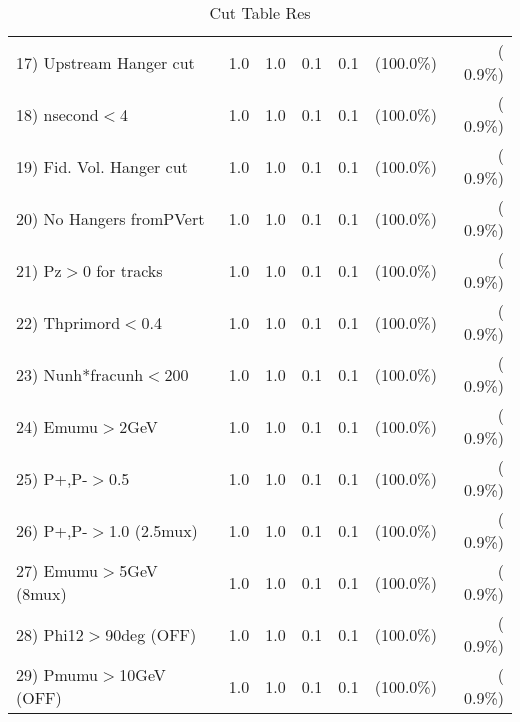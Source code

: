 \begin{table}[h!]
\begin{tabular}{||l||r|r|r|r|r|r||}
 17) Upstream Hanger cut  &          1.0 &          1.0 &          0.1 &          0.1 & (100.0\%) & (  0.9\%) \\
 18) nsecond$<$4          &          1.0 &          1.0 &          0.1 &          0.1 & (100.0\%) & (  0.9\%) \\
 19) Fid. Vol. Hanger cut &          1.0 &          1.0 &          0.1 &          0.1 & (100.0\%) & (  0.9\%) \\
 20) No Hangers fromPVert &          1.0 &          1.0 &          0.1 &          0.1 & (100.0\%) & (  0.9\%) \\
 21) Pz$>$0 for tracks    &          1.0 &          1.0 &          0.1 &          0.1 & (100.0\%) & (  0.9\%) \\
 22) Thprimord$<$0.4      &          1.0 &          1.0 &          0.1 &          0.1 & (100.0\%) & (  0.9\%) \\
 23) Nunh*fracunh$<$200   &          1.0 &          1.0 &          0.1 &          0.1 & (100.0\%) & (  0.9\%) \\
 24) Emumu$>$2GeV         &          1.0 &          1.0 &          0.1 &          0.1 & (100.0\%) & (  0.9\%) \\
 25) P+,P-$>$0.5          &          1.0 &          1.0 &          0.1 &          0.1 & (100.0\%) & (  0.9\%) \\
 26) P+,P-$>$1.0 (2.5mux) &          1.0 &          1.0 &          0.1 &          0.1 & (100.0\%) & (  0.9\%) \\
 27) Emumu$>$5GeV  (8mux) &          1.0 &          1.0 &          0.1 &          0.1 & (100.0\%) & (  0.9\%) \\
 28) Phi12$>$90deg  (OFF) &          1.0 &          1.0 &          0.1 &          0.1 & (100.0\%) & (  0.9\%) \\
 29) Pmumu$>$10GeV  (OFF) &          1.0 &          1.0 &          0.1 &          0.1 & (100.0\%) & (  0.9\%) \\
 \hline
 \hline
 \end{tabular}
 \caption{Cut Table  Res      }
 \label{tab-cutcohjpsi-mumu_res}
 \end{table}
